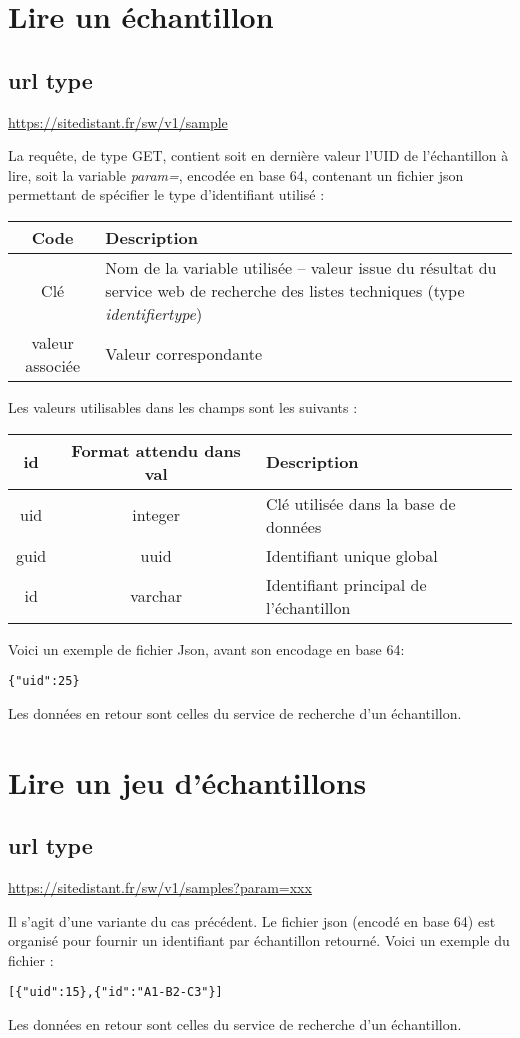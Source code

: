 \section{Lire un échantillon}

\subsection{url type}
\url{https://sitedistant.fr/sw/v1/sample}

La requête, de type GET, contient soit en dernière valeur l'UID de l'échantillon à lire, soit la variable \textit{param=}, encodée en base 64, contenant un fichier json permettant de spécifier le type d'identifiant utilisé :
\begin{longtable}{|c|>{\raggedright\arraybackslash}p{6cm}|}
\hline 
Code & Description \\ 
\hline
Clé & Nom de la variable utilisée -- valeur issue du résultat du service web de recherche des listes techniques (type \textit{identifiertype}) \\
\hline
valeur associée & Valeur correspondante\\
\hline
\endhead


\end{longtable}

Les valeurs utilisables dans les champs sont les suivants :
\begin{longtable}{|c|c|>{\raggedright\arraybackslash}p{6cm}|}
\hline 
id & Format attendu dans val & Description \\ 
\hline
uid & integer & Clé utilisée dans la base de données \\
\hline
guid & uuid & Identifiant unique global \\
\hline
id & varchar & Identifiant principal de l'échantillon\\
\hline \endhead

\end{longtable}

Voici un exemple de fichier Json, avant son encodage en base 64:
\begin{lstlisting}
{"uid":25}
\end{lstlisting}

Les données en retour sont celles du service de recherche d'un échantillon.

\section{Lire un jeu d'échantillons}
\subsection{url type}
\url{https://sitedistant.fr/sw/v1/samples?param=xxx}

Il s'agit d'une variante du cas précédent. Le fichier json (encodé en base 64) est organisé pour fournir un identifiant par échantillon retourné. Voici un exemple du fichier :
\begin{lstlisting}
[{"uid":15},{"id":"A1-B2-C3"}]
\end{lstlisting}
Les données en retour sont celles du service de recherche d'un échantillon.



